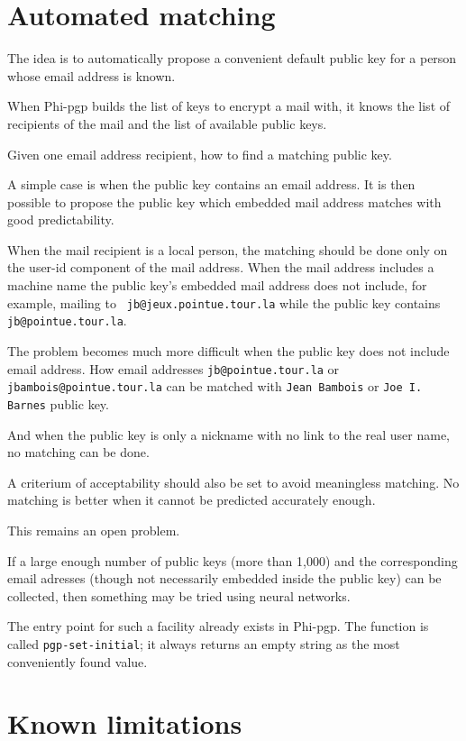 \section{Automated matching}

The idea is to automatically  propose a convenient default public  key
for a person whose email address is known.

When Phi-pgp builds the list of keys to encrypt a  mail with, it knows
the list of  recipients of the mail and  the list of available  public
keys.

Given one email address recipient, how to find a matching public key.

A simple case is when the public key contains an email address.  It is
then possible to propose  the public key  which embedded mail  address
matches with good predictability.

When the mail recipient is a local person, the matching should be done
only  on the user-id   component of the   mail address. When  the mail
address includes a machine name the public key's embedded mail address
does      not    include,   for   example,       mailing    to    {\tt
jb@jeux.pointue.tour.la}    while  the  public    key   contains  {\tt
jb@pointue.tour.la}.

The problem  becomes much more difficult  when the public key does not
include email address.  How  email addresses  {\tt jb@pointue.tour.la}
or  \\{\tt jbambois@pointue.tour.la}   can be  matched  with  {\tt  Jean
Bambois} or {\tt Joe I. Barnes} public key.

And  when the public key is  only a nickname with  no link to the real
user name, no matching can be done.

A criterium of  acceptability should also be  set to avoid meaningless
matching. No matching is better when it cannot be predicted accurately
enough.

This remains an open problem.

If a  large  enough number of  public  keys (more  than 1,000) and the
corresponding email  adresses (though not necessarily  embedded inside
the public key)  can be collected, then something  may be tried  using
neural networks.

The  entry point for such  a facility already exists  in Phi-pgp.  The
function is called {\tt  pgp-set-initial}; it always returns an  empty
string as the most conveniently found value.

\section{Known limitations}

